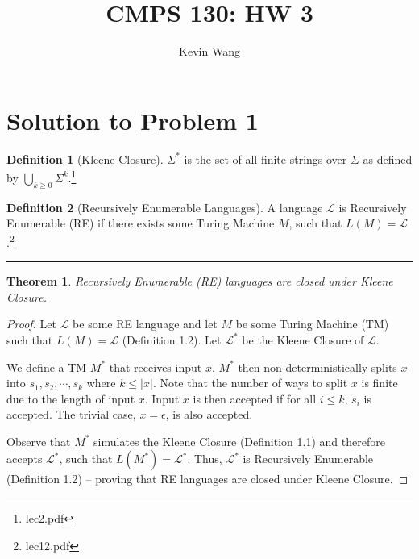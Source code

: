 \documentclass[11pt]{report}
\title{CMPS 130: HW 3}
\author{Kevin Wang}
\newcounter{problem}
\theoremstyle{definition}
\newtheorem{definition}{Definition}[problem]
\theoremstyle{plain}
\theoremstyle{plain}
\newtheorem{theorem*}{Theorem}
\begin{document}
\maketitle

\section*{Solution to Problem 1}

\begin{definition}[Kleene Closure]
$\Sigma^{*}$ is the set of all finite strings over $\Sigma$ 
as defined by $\underset{k \geq 0}{\bigcup} \Sigma^{k}$.\footnote{lec2.pdf}
\end{definition}

\begin{definition} [Recursively Enumerable Languages]
A language $\mathcal{L}$ is Recursively Enumerable (RE) if there exists some Turing Machine $M$,
such that $L(M)=\mathcal{L}$.\footnote{lec12.pdf}
\end{definition}

\hrule

\begin{theorem*}
Recursively Enumerable (RE) languages are closed under Kleene Closure.
\end{theorem*}

\begin{proof}
Let $\mathcal{L}$ be some RE language and let $M$ be some Turing Machine (TM) such that $L(M)=\mathcal{L}$ (Definition 1.2).
Let $\mathcal{L}^{*}$ be the Kleene Closure of $\mathcal{L}$. \newline

\noindent We define a TM $M^{*}$ that receives input $x$.
$M^{*}$ then non-deterministically splits $x$ into $s_{1},s_{2},\cdots,s_{k}$ where $k \leq |x|$.
Note that the number of ways to split $x$ is finite due to the length of input $x$.
Input $x$ is then accepted if for all $i \leq k$, $s_{i}$ is accepted.
The trivial case, $x= \epsilon$, is also accepted. \newline

\noindent Observe that $M^{*}$ simulates the Kleene Closure (Definition 1.1) and therefore accepts $\mathcal{L}^{*}$,
such that $L(M^{*})=\mathcal{L}^{*}$. Thus, $\mathcal{L}^{*}$ is Recursively Enumerable (Definition 1.2) --
proving that RE languages are closed under Kleene Closure.
\end{proof}

\pagebreak

\end{document}
